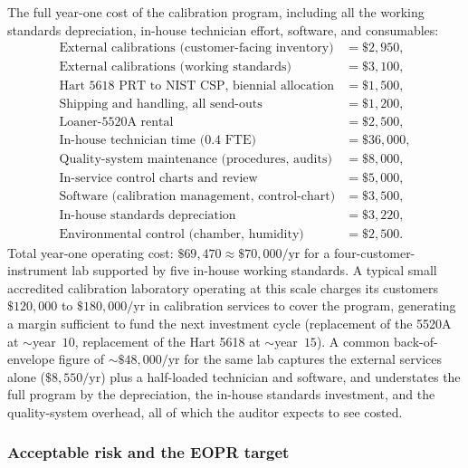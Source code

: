 The full year-one cost of the calibration program, including all
the working standards depreciation, in-house technician effort,
software, and consumables:
\begin{align*}
\text{External calibrations (customer-facing inventory)} &= \$2{,}950, \\
\text{External calibrations (working standards)} &= \$3{,}100, \\
\text{Hart 5618 PRT to NIST CSP, biennial allocation} &= \$1{,}500, \\
\text{Shipping and handling, all send-outs} &= \$1{,}200, \\
\text{Loaner-5520A rental} &= \$2{,}500, \\
\text{In-house technician time (0.4 FTE)} &= \$36{,}000, \\
\text{Quality-system maintenance (procedures, audits)} &= \$8{,}000, \\
\text{In-service control charts and review} &= \$5{,}000, \\
\text{Software (calibration management, control-chart)} &= \$3{,}500, \\
\text{In-house standards depreciation} &= \$3{,}220, \\
\text{Environmental control (chamber, humidity)} &= \$2{,}500.
\end{align*}
Total year-one operating cost: $\$69{,}470 \approx \$70{,}000/
\text{yr}$ for a four-customer-instrument lab supported by five
in-house working standards. A typical small accredited
calibration laboratory operating at this scale charges its
customers $\$120{,}000$ to $\$180{,}000/\text{yr}$ in calibration
services to cover the program, generating a margin sufficient to
fund the next investment cycle (replacement of the 5520A at
$\sim$year~$10$, replacement of the Hart 5618 at $\sim$year~$15$).
A common back-of-envelope figure of $\sim\$48{,}000/\text{yr}$
for the same lab captures the external services alone ($\$8{,}550
/\text{yr}$) plus a half-loaded technician and software, and
understates the full program by the depreciation, the in-house
standards investment, and the quality-system overhead, all of
which the auditor expects to see costed.

\subsubsection*{Acceptable risk and the EOPR target}

